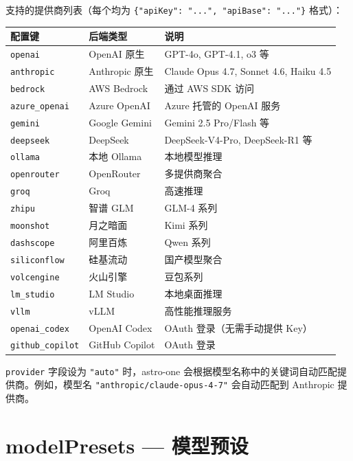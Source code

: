 \documentclass[12pt,a4paper,UTF8]{ctexart}
\begin{document}
支持的提供商列表（每个均为 \texttt{\{"apiKey": "...", "apiBase": "..."\}} 格式）：

\begin{longtable}{L{3.5cm} L{4cm} L{7.5cm}}
\toprule
\textbf{配置键} & \textbf{后端类型} & \textbf{说明} \\
\midrule
\texttt{openai} & OpenAI 原生 & GPT-4o, GPT-4.1, o3 等 \\
\texttt{anthropic} & Anthropic 原生 & Claude Opus 4.7, Sonnet 4.6, Haiku 4.5 \\
\texttt{bedrock} & AWS Bedrock & 通过 AWS SDK 访问 \\
\texttt{azure\_openai} & Azure OpenAI & Azure 托管的 OpenAI 服务 \\
\texttt{gemini} & Google Gemini & Gemini 2.5 Pro/Flash 等 \\
\texttt{deepseek} & DeepSeek & DeepSeek-V4-Pro, DeepSeek-R1 等 \\
\texttt{ollama} & 本地 Ollama & 本地模型推理 \\
\texttt{openrouter} & OpenRouter & 多提供商聚合 \\
\texttt{groq} & Groq & 高速推理 \\
\texttt{zhipu} & 智谱 GLM & GLM-4 系列 \\
\texttt{moonshot} & 月之暗面 & Kimi 系列 \\
\texttt{dashscope} & 阿里百炼 & Qwen 系列 \\
\texttt{siliconflow} & 硅基流动 & 国产模型聚合 \\
\texttt{volcengine} & 火山引擎 & 豆包系列 \\
\texttt{lm\_studio} & LM Studio & 本地桌面推理 \\
\texttt{vllm} & vLLM & 高性能推理服务 \\
\texttt{openai\_codex} & OpenAI Codex & OAuth 登录（无需手动提供 Key） \\
\texttt{github\_copilot} & GitHub Copilot & OAuth 登录 \\
\bottomrule
\end{longtable}

\begin{tipbox}
\texttt{provider} 字段设为 \texttt{"auto"} 时，astro-one 会根据模型名称中的关键词自动匹配提供商。例如，模型名 \texttt{"anthropic/claude-opus-4-7"} 会自动匹配到 Anthropic 提供商。
\end{tipbox}

\section{modelPresets — 模型预设}
\end{document}
